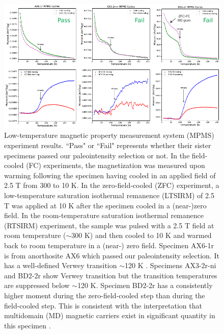 \documentclass[9pt,twoside,lineno]{pnas-new}
\begin{document}
\clearpage

\begin{figure}
\noindent\includegraphics[width=\textwidth]{MPMS.pdf}
\centering
\caption{{Low-temperature magnetic property measurement system (MPMS) experiment results. ``Pass" or ``Fail" represents whether their sister specimens passed our paleointensity selection or not. In the field-cooled (FC) experiments, the magnetization was measured upon warming following the specimen having cooled in an applied field of 2.5 T from 300 to 10 K. In the zero-field-cooled (ZFC) experiment, a low-temperature saturation isothermal remanence (LTSIRM) of 2.5 T was applied at 10 K after the specimen cooled in a (near-)zero field. In the room-temperature saturation isothermal remanence (RTSIRM) experiment, the sample was pulsed with a 2.5 T field at room temperature ($\sim$300 K) and then cooled to 10 K and warmed back to room temperature in a (near-) zero field. Specimen AX6-1r is from anorthosite AX6 which passed our paleointensity selection. It has a well-defined Verwey transition $\sim$120 K \cite{Verwey1939a}. Specimens AX3-2r-ni and BD2-2r show Verwey transition but the transition temperatures are suppressed below $\sim$120 K. Specimen BD2-2r has a consistently higher moment during the zero-field-cooled step than during the field-cooled step. This is consistent with the interpretation that multidomain (MD) magnetic carriers exist in significant quantity in this specimen \cite{Carter-Stiglitz2006a}.}}
\label{fig:MPMS}
\end{figure}

\clearpage
\end{document}
